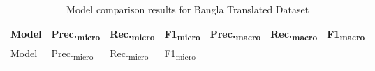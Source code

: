\documentclass[]{article}
\begin{document}
\begingroup
\footnotesize
\setlength{\tabcolsep}{2pt}
\begin{longtable}[]{@{}
  >{\raggedright\arraybackslash}p{}
  >{\centering\arraybackslash}p{}
  >{\centering\arraybackslash}p{}
  >{\centering\arraybackslash}p{}
  >{\centering\arraybackslash}p{}
  >{\centering\arraybackslash}p{}
  >{\centering\arraybackslash}p{}@{}}
\caption{Model comparison results for Bangla Translated
Dataset}\tabularnewline
\toprule\noalign{}
\begin{minipage}[b]{\linewidth}\raggedright
Model
\end{minipage} & \begin{minipage}[b]{\linewidth}\raggedright
Prec.\textsubscript{micro}
\end{minipage} & \begin{minipage}[b]{\linewidth}\raggedright
Rec.\textsubscript{micro}
\end{minipage} & \begin{minipage}[b]{\linewidth}\raggedright
F1\textsubscript{micro}
\end{minipage} & \begin{minipage}[b]{\linewidth}\raggedright
Prec.\textsubscript{macro}
\end{minipage} & \begin{minipage}[b]{\linewidth}\raggedright
Rec.\textsubscript{macro}
\end{minipage} & \begin{minipage}[b]{\linewidth}\raggedright
F1\textsubscript{macro}
\end{minipage} \\
\midrule\noalign{}
\endfirsthead
\toprule\noalign{}
\begin{minipage}[b]{\linewidth}\raggedright
Model
\end{minipage} & \begin{minipage}[b]{\linewidth}\raggedright
Prec.\textsubscript{micro}
\end{minipage} & \begin{minipage}[b]{\linewidth}\raggedright
Rec.\textsubscript{micro}
\end{minipage} & \begin{minipage}[b]{\linewidth}\raggedright
F1\textsubscript{micro}
\end{minipage} & \begin{minipage}[b]{\linewidth}\raggedright

\end{minipage}
\end{longtable}
\end{document}
